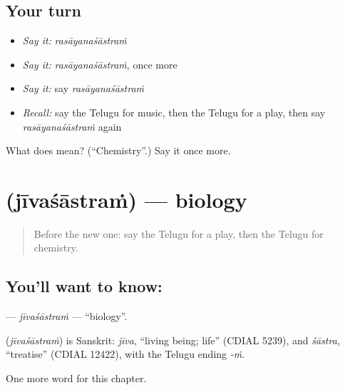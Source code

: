 \subsection*{Your turn}
\begin{itemize}
\raggedright
  \item \emph{Say it:} \emph{rasāyanaśāstraṁ}
  \item \emph{Say it:} \emph{rasāyanaśāstraṁ}, once more
  \item \emph{Say it:} say \emph{rasāyanaśāstraṁ}
  \item \emph{Recall:} say the Telugu for music, then the Telugu for a play, then say \emph{rasāyanaśāstraṁ} again
\end{itemize}

\begin{tcolorbox}[breakable,colback=teal!4,colframe=teal!35!black,title={Before you move on}]
What does  mean? (\textquotedblleft{}Chemistry\textquotedblright{}.) Say it once more.
\end{tcolorbox}
\section[\texorpdfstring{\te{జీవశాస్త్రం} (jīvaśāstraṁ)}{జీవశాస్త్రం (jīvaśāstraṁ)}]{ (jīvaśāstraṁ) — biology}

\label{lesson:TE-C276-jivasastram}



\begin{quote}
Before the new one: say the Telugu for a play, then the Telugu for chemistry.
\end{quote}

\subsection*{You'll want to know: }
\textbf{} — \emph{jīvaśāstraṁ} — \textquotedblleft{}biology\textquotedblright{}.

\begin{cousinweb}
\textbf{} (\emph{jīvaśāstraṁ}) is Sanskrit: \emph{jīva}, \textquotedblleft{}living being; life\textquotedblright{} (CDIAL 5239), and \emph{śāstra}, \textquotedblleft{}treatise\textquotedblright{} (CDIAL 12422), with the Telugu ending \emph{-ṁ}.
\end{cousinweb}

\begin{grammarlens}[title={What you've built}]
One more word for this chapter.
\end{grammarlens}


